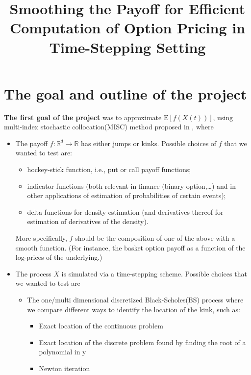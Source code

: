 \documentclass[11pt]{article}
\title{ Smoothing  the  Payoff for  Efficient Computation of Option Pricing in
  Time-Stepping Setting}
\date{ }
\newcommand{\expt}[1]{\mathrm{E}\left[#1\right]}
\newcommand{\rset}{\mathbb{R}}
\begin{document}
\maketitle

\section{The goal and outline of the project}
\textbf{The first goal of the project} was to approximate $\expt{f(X(t))}$, using multi-index stochastic collocation(MISC) method proposed in \cite{haji2016multi},  where 

\begin{itemize}
	\item The payoff $f:\rset^d \rightarrow \rset$ has either jumps or kinks. Possible choices of $f$ that we wanted to test are:
	
	\begin{itemize}
		\item hockey-stick function, i.e., put or call payoff functions;
		\item indicator functions (both relevant in finance (binary option,\dots) and in other applications of estimation of probabilities of certain events);
		\item delta-functions for density estimation (and derivatives thereof for	estimation of derivatives of the density).
	\end{itemize}
	More specifically, $f$ should be the composition of one of the above with a smooth function. (For instance, the basket option payoff as a function of the log-prices of the underlying.)
	\item The process $X$ is simulated via a time-stepping scheme. Possible choices that we wanted to test are
		\begin{itemize}
		\item The one/multi dimensional discretized Black-Scholes(BS) process where we compare
		different ways to identify the location of the kink, such as:
		\begin{itemize}
			\item Exact location of the continuous problem
			\item  Exact location of the discrete problem found by finding the root of a polynomial in y
			\item Newton iteration
		\end{itemize}


\end{itemize}
\end{itemize}
\end{document}
